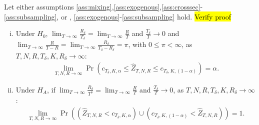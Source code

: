 \begin{theorem}
\label{th:subsampling}

Let either assumptions \ref{ass:mixing},\ref{ass:exogenous},\ref{ass:crosssec}-\ref{ass:subsampling}, or , \ref{ass:exogenous}-\ref{ass:subsampling} hold. \hl{Verify proof}

\begin{enumerate}[(i)]
\item Under $H_{0}$, $\lim_{T \rightarrow \infty }\frac{R_\delta}{T_\delta}=\lim_{T \rightarrow \infty }\frac{R}{T}$ and $\frac{T_\delta}{T}\rightarrow 0$ and $\lim_{T \rightarrow \infty }\frac{R}{T-R}=\lim_{T \rightarrow \infty }\frac{R_\delta}{T_\delta-R_\delta}=\pi$, with $0 \leq \pi <\infty$, as $T,N,R,T_\delta,K,R_\delta\rightarrow \infty$:
\begin{align*}
    \lim_{T,N,R\rightarrow \infty }\Pr \left( c_{T_\delta,K,\alpha }\leq \widehat{Z}_{T,N,R}\leq c_{T_\delta,K,(1-\alpha )}\right) = \alpha.
\end{align*}

\item Under $H_{A}$, if $\lim_{T \rightarrow \infty }\frac{R_\delta}{T^\delta}=\lim_{T \rightarrow \infty }\frac{R}{T}$ and $\frac{T_\delta}{T} \rightarrow 0$, as $T,N,R,T_\delta,K,R_\delta \rightarrow \infty$:
\begin{align*}
    \lim_{T,N,R\rightarrow \infty }\Pr \left( \left( \widehat{Z}_{T,N,R}<c_{T_\delta,K,\alpha }\right) \cup \left( c_{T_\delta,K,(1-\alpha )} < \widehat{Z}_{T,N,R}\right) \right) = 1.
\end{align*}
\end{enumerate}
\end{theorem}